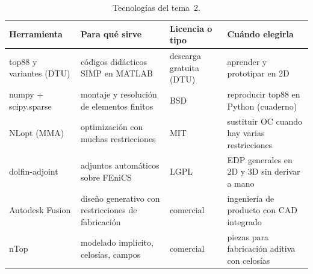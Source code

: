 \begin{table}[h]
\centering\small
\begin{tabularx}{\textwidth}{@{}l>{\raggedright\arraybackslash}X>{\raggedright\arraybackslash}p{2.7cm}>{\raggedright\arraybackslash}X@{}}
\toprule
Herramienta & Para qué sirve & Licencia o tipo & Cuándo elegirla \\
\midrule
top88 y variantes (DTU) & códigos didácticos SIMP en MATLAB & descarga gratuita (DTU) & aprender y prototipar en 2D \\
numpy + scipy.sparse & montaje y resolución de elementos finitos & BSD & reproducir top88 en Python (cuaderno) \\
NLopt (MMA) & optimización con muchas restricciones & MIT & sustituir OC cuando hay varias restricciones \\
dolfin-adjoint & adjuntos automáticos sobre FEniCS & LGPL & EDP generales en 2D y 3D sin derivar a mano \\
Autodesk Fusion & diseño generativo con restricciones de fabricación & comercial & ingeniería de producto con CAD integrado \\
nTop & modelado implícito, celosías, campos & comercial & piezas para fabricación aditiva con celosías \\
\bottomrule
\end{tabularx}
\caption{Tecnologías del tema~2.}
\label{tab:tec2}
\end{table}

\addtocounter{definicion}{1}%

